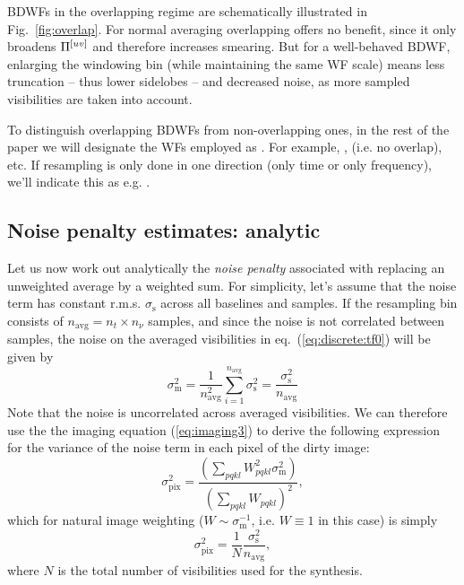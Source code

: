 \documentclass[useAMS,usenatbib]{mn2e}
\newcommand{\OMS}[1]{\textcolor{red}{{\bf OMS: #1}}}
\begin{document}
BDWFs in the overlapping regime are schematically illustrated in Fig.~\ref{fig:overlap}. For normal averaging 
overlapping offers no benefit, since it only broadens $\Pi^{[uv]}$ and therefore increases smearing. But for a well-behaved 
BDWF, enlarging the windowing bin (while maintaining the same WF scale) means less truncation -- thus lower 
sidelobes -- and decreased noise, as more sampled visibilities are taken into account.

To distinguish overlapping BDWFs from non-overlapping ones, in the rest of the paper we will designate the 
WFs employed as . For example, ,  (i.e. no overlap), etc.
If resampling is only done in one direction (only time or only frequency), we'll indicate this as e.g. .

\subsection{Noise penalty estimates: analytic}
\label{sec:imaging}

Let us now work out analytically the \emph{noise penalty} associated with replacing an unweighted average by 
a weighted sum. For simplicity, let's assume that the noise term
has constant r.m.s. $\sigma_\mathrm{s}$ across all baselines and samples. If the resampling bin 
consists of $n_\mathrm{avg} = n_t\times n_\nu$ samples, and since the noise is not correlated between samples, 
the noise on the averaged visibilities in eq.~(\ref{eq:discrete:tf0}) will be given by
\begin{equation}
\sigma_\mathrm{m}^2 = \frac{1}{n_\mathrm{avg}^2} \sum_{i=1}^{n_\mathrm{avg}} \sigma_\mathrm{s}^2  = \frac{\sigma_\mathrm{s}^2}{n_\mathrm{avg}}
\end{equation}
Note that the noise is uncorrelated across averaged visibilities. We can therefore use the
the imaging equation (\ref{eq:imaging3}) to derive the following expression for the variance of the noise 
term in each pixel of the dirty image:
\begin{equation}
\label{eq:noise:image}
\sigma_\mathrm{pix}^2 = \frac{ (\sum_{pqkl} W_{pqkl}^2 \sigma_\mathrm{m}^2) }{ (\sum_{pqkl} W_{pqkl})^2 },
\end{equation}
which for natural image weighting ($W\sim\sigma^{-1}_\mathrm{m}$, i.e. $W\equiv1$ in this case) is simply
\begin{equation}
\sigma_\mathrm{pix}^2 = \frac{1}{N}\frac{\sigma_\mathrm{s}^2}{n_\mathrm{avg}},
\end{equation}
where $N$ is the total number of visibilities used for the synthesis.
\end{document}
